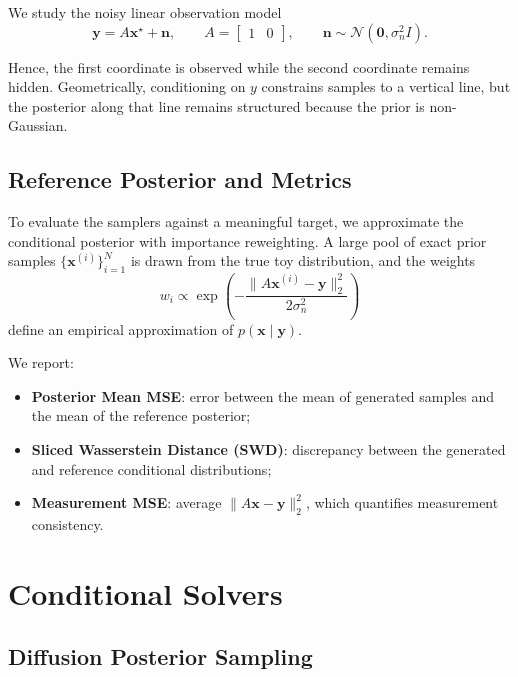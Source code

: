 \documentclass[10pt,twocolumn]{article}
\begin{document}
We study the noisy linear observation model
\begin{equation}
\mathbf{y} = A\mathbf{x}^\star + \mathbf{n},
\qquad
A = \begin{bmatrix}1 & 0\end{bmatrix},
\qquad
\mathbf{n} \sim \mathcal{N}(\mathbf{0}, \sigma_n^2 I).
\end{equation}

Hence, the first coordinate is observed while the second coordinate remains hidden. Geometrically, conditioning on \(y\) constrains samples to a vertical line, but the posterior along that line remains structured because the prior is non-Gaussian.

\subsection{Reference Posterior and Metrics}

To evaluate the samplers against a meaningful target, we approximate the conditional posterior with importance reweighting. A large pool of exact prior samples \(\{\mathbf{x}^{(i)}\}_{i=1}^N\) is drawn from the true toy distribution, and the weights
\begin{equation}
w_i \propto \exp\left(
-\frac{\|A\mathbf{x}^{(i)} - \mathbf{y}\|_2^2}{2\sigma_n^2}
\right)
\end{equation}
define an empirical approximation of \(p(\mathbf{x}\mid \mathbf{y})\).

We report:
\begin{itemize}[leftmargin=1.5em]
    \item \textbf{Posterior Mean MSE}: error between the mean of generated samples and the mean of the reference posterior;
    \item \textbf{Sliced Wasserstein Distance (SWD)}: discrepancy between the generated and reference conditional distributions;
    \item \textbf{Measurement MSE}: average \(\|A\mathbf{x} - \mathbf{y}\|_2^2\), which quantifies measurement consistency.
\end{itemize}

\section{Conditional Solvers}

\subsection{Diffusion Posterior Sampling}
\end{document}
